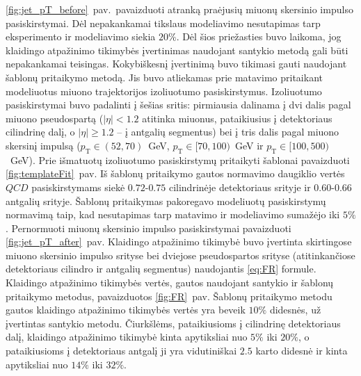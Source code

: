 \documentclass[a4paper, 12pt, oneside]{article}
\newcommand{\pT}{p_{\mathrm{T}}}
\newcommand{\QCD}{QC\! D}
\newlength\q
\begin{document}
\ref{fig:jet_pT_before}~pav.\ pavaizduoti atranką praėjusių miuonų skersinio impulso pasiskirstymai.
Dėl nepakankamai tikslaus modeliavimo nesutapimas tarp eksperimento ir modeliavimo siekia $20\%$.
Dėl šios priežasties buvo laikoma, jog klaidingo atpažinimo tikimybės įvertinimas naudojant santykio metodą gali būti
nepakankamai teisingas.
Kokybiškesnį įvertinimą buvo tikimasi gauti naudojant šablonų pritaikymo metodą.
Jis buvo atliekamas prie matavimo pritaikant modeliuotus miuono trajektorijos izoliuotumo pasiskirstymus.
Izoliuotumo pasiskirstymai buvo padalinti į šešias sritis: pirmiausia dalinama į dvi dalis pagal miuono pseudospartą
($|\eta|<1.2$ atitinka miuonus, pataikiusius į detektoriaus cilindrinę dalį, o $|\eta|\geqslant 1.2$ -- į antgalių segmentus)
bei į tris dalis pagal miuono skersinį impulsą ($\pT\in(52, 70)$~GeV, $\pT\in[70, 100)$~GeV ir $\pT\in[100, 500)$~GeV).
Prie išmatuotų izoliuotumo pasiskirstymų pritaikyti šablonai pavaizduoti \ref{fig:templateFit}~pav.
Iš šablonų pritaikymo gautos normavimo daugiklio vertės $\QCD$ pasiskirstymams siekė $0.72$-$0.75$ cilindrinėje detektoriaus
srityje ir $0.60$-$0.66$ antgalių srityje.
Šablonų pritaikymas pakoregavo modeliuotų pasiskirstymų normavimą taip, kad nesutapimas tarp matavimo ir modeliavimo
sumažėjo iki $5\%$.
Pernormuoti miuonų skersinio impulso pasiskirstymai pavaizduoti \ref{fig:jet_pT_after}~pav.
Klaidingo atpažinimo tikimybė buvo įvertinta skirtingose miuono skersinio impulso srityse bei dviejose pseudospartos srityse
(atitinkančiose detektoriaus cilindro ir antgalių segmentus) naudojantis \ref{eq:FR} formule.
Klaidingo atpažinimo tikimybės vertės, gautos naudojant santykio ir šablonų pritaikymo metodus, pavaizduotos \ref{fig:FR}~pav.
Šablonų pritaikymo metodu gautos klaidingo atpažinimo tikimybės vertės yra beveik $10\%$ didesnės, už įvertintas
santykio metodu.
Čiurkšlėms, pataikiusioms į cilindrinę detektoriaus dalį, klaidingo atpažinimo tikimybė kinta apytiksliai nuo $5\%$ iki $20\%$,
o pataikiusioms į detektoriaus antgalį ji yra vidutiniškai $2.5$ karto didesnė ir kinta
apytiksliai nuo $14\%$ iki $32\%$.
\end{document}
